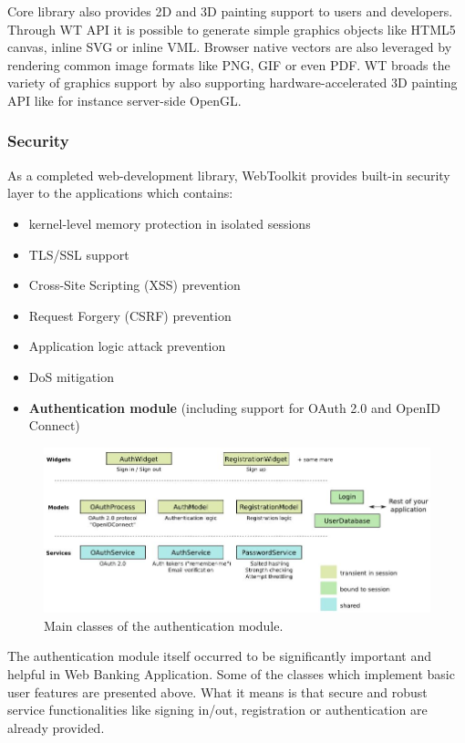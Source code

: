 \documentclass[a4paper,12pt]{article}
\newcommand\tab[1][1cm]{\hspace*{#1}}
\begin{document}
{{{\bigskip
Core library also provides 2D and 3D painting support to users and developers. Through WT API it is possible to generate simple graphics objects like HTML5 canvas, inline SVG or inline VML. Browser native vectors are also leveraged by rendering common image formats like PNG, GIF or even PDF. WT broads the variety of graphics support by also supporting hardware-accelerated 3D painting API like for instance server-side OpenGL.
}

\subsubsection*{Security}
{
\tab As a completed web-development library, WebToolkit provides built-in security layer to the applications which contains:

\begin{itemize}
	\item kernel-level memory protection in isolated sessions
	\item TLS/SSL support
	\item Cross-Site Scripting (XSS) prevention
	\item Request Forgery (CSRF) prevention
	\item Application logic attack prevention
	\item DoS mitigation
	\item \textbf{Authentication module} (including support for OAuth 2.0 and OpenID Connect)
\end{itemize}

\begin{figure}[h]
  \centering
    \includegraphics[width=1.1\textwidth]{auth-module}
    \caption{Main classes of the authentication module\cite{authmodule}.}
\end{figure}

The authentication module itself occurred to be significantly important and helpful in Web Banking Application. Some of the classes which implement basic user features are presented above. What it means is that secure and robust service functionalities like signing in/out, registration or authentication are already provided.

}}}
\end{document}
